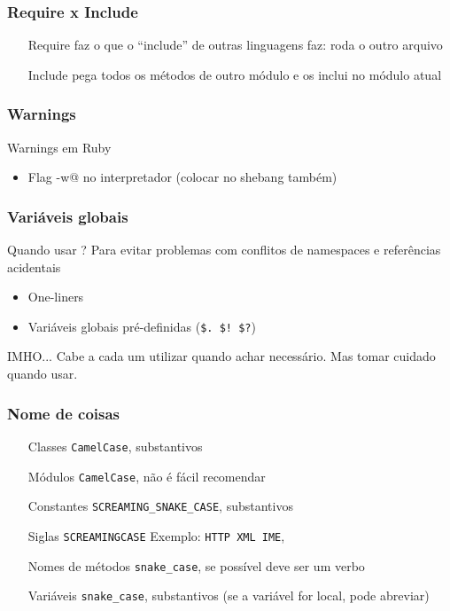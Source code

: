 \documentclass{beamer}
\begin{document}
\begin{frame}
    \frametitle{Require x Include}
    \begin{itemize}
        \item[Require] faz o que o ``include'' de outras linguagens faz: roda o outro arquivo
        \item[Include] pega todos os métodos de outro módulo e os inclui no módulo atual
    \end{itemize}
\end{frame}

\begin{frame}[fragile]
    \frametitle{Warnings}
    \begin{block}{Warnings em Ruby}
        \begin{itemize}
            \item Flag \verb@-w@ no interpretador (colocar no shebang também)
        \end{itemize}
    \end{block}
\end{frame}

\begin{frame}[fragile]
    \frametitle{Variáveis globais}
    \begin{block}{Quando usar ?}
        Para evitar problemas com conflitos de namespaces e referências acidentais
        \begin{itemize}
            \item One-liners
            \item Variáveis globais pré-definidas (\verb#$. $! $?#)
        \end{itemize}
    \end{block}
    \begin{block}{IMHO...}
        Cabe a cada um utilizar quando achar necessário. Mas tomar cuidado quando usar.
    \end{block}
\end{frame}

\begin{frame}[fragile]
    \frametitle{Nome de coisas}
    \begin{itemize}
        \centering
        \item[Classes] \verb#CamelCase#, substantivos
        \item[Módulos] \verb#CamelCase#, não é fácil recomendar
        \item[Constantes] \verb#SCREAMING_SNAKE_CASE#, substantivos
        \item[Siglas] \verb#SCREAMINGCASE# Exemplo: \verb#HTTP XML IME#, 
        \item[Nomes de métodos] \verb#snake_case#, se possível deve ser um verbo
        \item[Variáveis] \verb#snake_case#, substantivos (se a variável for local, pode abreviar)
    \end{itemize}
\end{frame}
\end{document}
